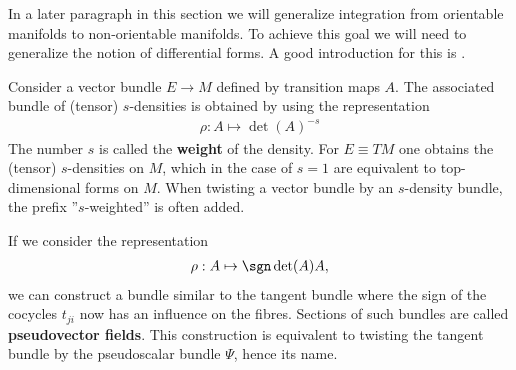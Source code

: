     In a later paragraph in this section we will generalize integration from orientable manifolds to non-orientable manifolds. To achieve this goal we will need to generalize the notion of differential forms. A good introduction for this is \cite{tensor_bundle_calculus}.

    \begin{definition}\label{diff:density}
        Consider a vector bundle $E\rightarrow M$ defined by transition maps $A$. The associated bundle of (tensor) $s$-densities is obtained by using the representation
        \begin{gather}
            \rho:A\mapsto\det(A)^{-s}
        \end{gather}
        The number $s$ is called the \textbf{weight} of the density. For $E\equiv TM$ one obtains the (tensor) $s$-densities on $M$, which in the case of $s=1$ are equivalent to top-dimensional forms on $M$. When twisting a vector bundle by an $s$-density bundle, the prefix ''$s$-weighted'' is often added.
    \end{definition}

    \begin{example}[Pseudovectors]
        If we consider the representation
        \begin{gather}
            \rho:A\mapsto\sgn\det(A)A,
        \end{gather}
        we can construct a bundle similar to the tangent bundle where the sign of the cocycles $t_{ji}$ now has an influence on the fibres. Sections of such bundles are called \textbf{pseudovector fields}. This construction is equivalent to twisting the tangent bundle by the pseudoscalar bundle $\Psi$, hence its name.
    \end{example}

